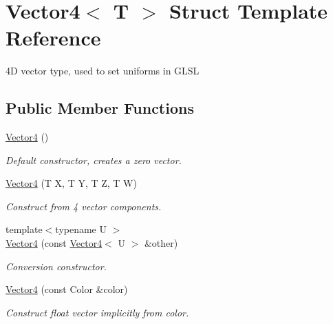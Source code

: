 \hypertarget{struct_vector4}{}\section{Vector4$<$ T $>$ Struct Template Reference}
\label{struct_vector4}


4D vector type, used to set uniforms in G\+L\+SL  


\subsection*{Public Member Functions}
\begin{DoxyCompactItemize}
\item 
\mbox{\label{struct_vector4_afdef97d94e5697622b5322637028accf}} 
\hyperlink{struct_vector4_afdef97d94e5697622b5322637028accf}{Vector4} ()
\begin{DoxyCompactList}\small\item\em Default constructor, creates a zero vector. \end{DoxyCompactList}\item 
\hyperlink{struct_vector4_ae099ed0a6d7d78ed38ac023d0e4cec25}{Vector4} (T X, T Y, T Z, T W)
\begin{DoxyCompactList}\small\item\em Construct from 4 vector components. \end{DoxyCompactList}\item 
{\footnotesize template$<$typename U $>$ }\\\hyperlink{struct_vector4_a6413d8b504d7fdfbb600a0caf9c90cc2}{Vector4} (const \hyperlink{struct_vector4}{Vector4}$<$ U $>$ \&other)
\begin{DoxyCompactList}\small\item\em Conversion constructor. \end{DoxyCompactList}\item 
\hyperlink{struct_vector4_af1da65a743ddbb5c779b41eae766c00d}{Vector4} (const Color \&color)
\begin{DoxyCompactList}\small\item\em Construct float vector implicitly from color. \end{DoxyCompactList}\end{DoxyCompactItemize}
